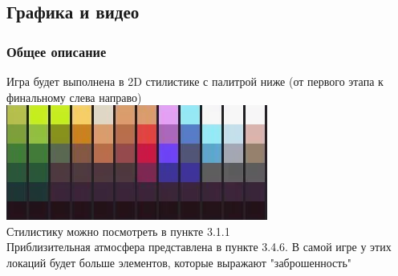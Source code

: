\documentclass{article}
\begin{document}
\subsection{Графика и видео}
\subsubsection{Общее описание}
Игра будет выполнена в 2D стилистике с палитрой ниже (от первого этапа к финальному слева направо) \\
\includegraphics[width=0.3\linewidth]{images/palitra.png}\\
Стилистику можно посмотреть в пункте 3.1.1
\\
Приблизительная атмосфера представлена в пункте 3.4.6. В самой игре у этих локаций будет больше элементов, которые выражают "заброшенность"
\end{document}
